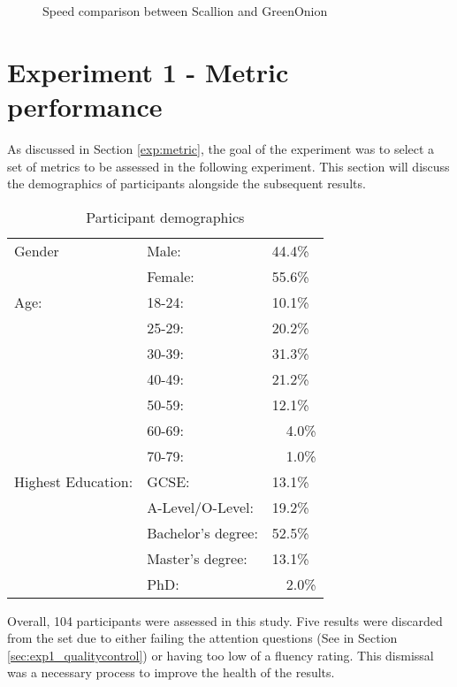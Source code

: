 \begin{figure}[h!]
    \centering
    
    \label{tab:scallion_speed}
    \caption{Speed comparison between Scallion and GreenOnion}
\end{figure}

\newpage

\section{Experiment 1 - Metric performance}

As discussed in Section \ref{exp:metric}, the goal of the experiment was to select a set of metrics to be assessed in the following experiment. This section will discuss the demographics of participants alongside the subsequent results.

\begin{table}[h!]
    \centering
    \begin{tabular}{|l|ll|}
        \hline
        Gender & Male: & 44.4\% \\
               & Female: & 55.6\% \\
        \hline
        Age:   & 18-24: & 10.1\% \\
               & 25-29: & 20.2\% \\
               & 30-39: & 31.3\% \\
               & 40-49: & 21.2\% \\
               & 50-59: & 12.1\% \\
               & 60-69: & ~~4.0\% \\ 
               & 70-79: & ~~1.0\% \\ 
               
        \hline
        Highest Education:  
        & GCSE:                 & 13.1\% \\
        & A-Level/O-Level:      & 19.2\% \\
        & Bachelor's degree:    & 52.5\% \\
        & Master's degree:      & 13.1\% \\ 
        & PhD:                  & ~~2.0\%  \\
        \hline

    \end{tabular}
    \caption{Participant demographics}
    \label{tab:exp1_demo}
\end{table}

Overall, 104 participants were assessed in this study. Five results were discarded from the set due to either failing the attention questions (See in Section \ref{sec:exp1_qualitycontrol}) or having too low of a fluency rating. This dismissal was a necessary process to improve the health of the results. 


